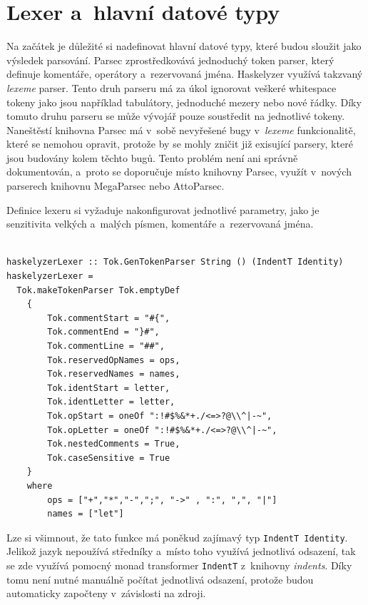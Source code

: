 \documentclass[male, czech]{kithesis}
\newenvironment{code}{\captionsetup{type=listing}}{}
\newcommand{\haskellInline}[1]{\colorbox{gray!10}{\texttt{#1}}}
\begin{document}
\section{Lexer a~hlavní datové typy}

Na začátek je důležité si nadefinovat hlavní datové typy, 
které budou sloužit jako výsledek parsování.
Parsec zprostředkovává jednoduchý token parser, 
který definuje komentáře, 
operátory a~rezervovaná jména.
Haskelyzer využívá takzvaný \textit{lexeme} parser.
Tento druh parseru má za úkol ignorovat veškeré whitespace tokeny jako
jsou například tabulátory, 
jednoduché mezery nebo nové řádky.
Díky tomuto druhu parseru se může vývojář pouze soustředit na 
jednotlivé tokeny. 
Naneštěstí knihovna Parsec má v~sobě nevyřešené bugy v~\textit{lexeme} funkcionalitě, 
které se nemohou opravit, 
protože by se mohly zničit již exisující parsery,
které jsou budovány kolem těchto bugů.
Tento problém není ani správně dokumentován, 
a~proto se doporučuje místo knihovny Parsec, 
využít v~nových parserech knihovnu MegaParsec nebo AttoParsec. 

Definice lexeru si vyžaduje nakonfigurovat jednotlivé parametry,
jako je senzitivita velkých a~malých písmen, 
komentáře a~rezervovaná jména.

\begin{code}
\begin{verbatim}

haskelyzerLexer :: Tok.GenTokenParser String () (IndentT Identity)
haskelyzerLexer =
  Tok.makeTokenParser Tok.emptyDef 
    { 
        Tok.commentStart = "#{",
        Tok.commentEnd = "}#",
        Tok.commentLine = "##",
        Tok.reservedOpNames = ops,
        Tok.reservedNames = names,
        Tok.identStart = letter,
        Tok.identLetter = letter,
        Tok.opStart = oneOf ":!#$%&*+./<=>?@\\^|-~",
        Tok.opLetter = oneOf ":!#$%&*+./<=>?@\\^|-~",
        Tok.nestedComments = True,
        Tok.caseSensitive = True
    }
    where
        ops = ["+","*","-",";", "->" , ":", ",", "|"]
        names = ["let"]

\end{verbatim}
\end{code}

Lze si všimnout, 
že tato funkce má poněkud zajímavý typ \haskellInline{IndentT Identity}.
Jelikož jazyk nepoužívá středníky
a~místo toho využívá jednotlivá odsazení, 
tak se zde využívá pomocný monad transformer \haskellInline{IndentT} z~knihovny \textit{indents}. 
Díky tomu není nutné manuálně počítat jednotlivá odsazení, 
protože budou automaticky započteny v~závislosti na zdroji.
\end{document}
